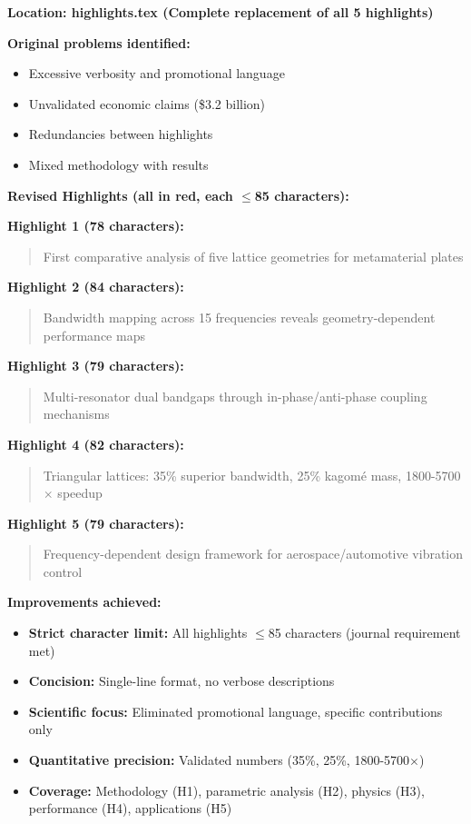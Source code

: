 \documentclass[11pt,a4paper]{article}
\newenvironment{changesbox}{%
    \par\medskip\noindent{\color{changescolor}\rule{\linewidth}{2pt}}\par
    \noindent{\color{changescolor}\bfseries Manuscript Changes}\par\smallskip
}{%
    \par\noindent{\color{changescolor}\rule{\linewidth}{0.5pt}}\medskip
}
\begin{document}
\begin{changesbox}
\textbf{Location: highlights.tex (Complete replacement of all 5 highlights)}

\textbf{Original problems identified:}
\begin{itemize}
    \item Excessive verbosity and promotional language
    \item Unvalidated economic claims (\$3.2 billion)
    \item Redundancies between highlights
    \item Mixed methodology with results
\end{itemize}

\textbf{Revised Highlights (all in red, each $\leq$85 characters):}

\textbf{Highlight 1 (78 characters):}
\begin{quote}
\textcolor{redtext}{First comparative analysis of five lattice geometries for metamaterial plates}
\end{quote}

\textbf{Highlight 2 (84 characters):}
\begin{quote}
\textcolor{redtext}{Bandwidth mapping across 15 frequencies reveals geometry-dependent performance maps}
\end{quote}

\textbf{Highlight 3 (79 characters):}
\begin{quote}
\textcolor{redtext}{Multi-resonator dual bandgaps through in-phase/anti-phase coupling mechanisms}
\end{quote}

\textbf{Highlight 4 (82 characters):}
\begin{quote}
\textcolor{redtext}{Triangular lattices: 35\% superior bandwidth, 25\% kagom\'{e} mass, 1800-5700$\times$ speedup}
\end{quote}

\textbf{Highlight 5 (79 characters):}
\begin{quote}
\textcolor{redtext}{Frequency-dependent design framework for aerospace/automotive vibration control}
\end{quote}

\textbf{Improvements achieved:}
\begin{itemize}
    \item \textbf{Strict character limit:} All highlights $\leq$85 characters (journal requirement met)
    \item \textbf{Concision:} Single-line format, no verbose descriptions
    \item \textbf{Scientific focus:} Eliminated promotional language, specific contributions only
    \item \textbf{Quantitative precision:} Validated numbers (35\%, 25\%, 1800-5700$\times$)
    \item \textbf{Coverage:} Methodology (H1), parametric analysis (H2), physics (H3), performance (H4), applications (H5)
\end{itemize}
\end{changesbox}
\end{document}
